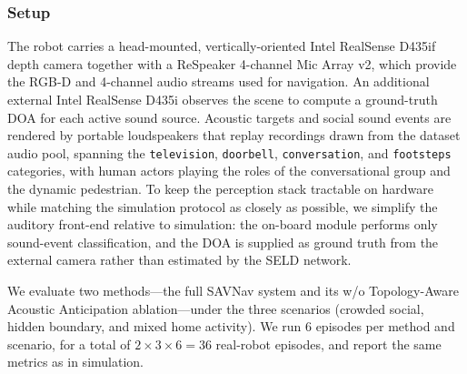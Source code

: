 \subsubsection{Setup}
The robot carries a head-mounted, vertically-oriented Intel RealSense D435if depth camera together with a ReSpeaker 4-channel Mic Array v2, which provide the RGB-D and 4-channel audio streams used for navigation. An additional external Intel RealSense D435i observes the scene to compute a ground-truth DOA for each active sound source. Acoustic targets and social sound events are rendered by portable loudspeakers that replay recordings drawn from the dataset audio pool, spanning the \texttt{television}, \texttt{doorbell}, \texttt{conversation}, and \texttt{footsteps} categories, with human actors playing the roles of the conversational group and the dynamic pedestrian. To keep the perception stack tractable on hardware while matching the simulation protocol as closely as possible, we simplify the auditory front-end relative to simulation: the on-board module performs only sound-event classification, and the DOA is supplied as ground truth from the external camera rather than estimated by the SELD network.

We evaluate two methods---the full SAVNav system and its w/o Topology-Aware Acoustic Anticipation ablation---under the three scenarios (crowded social, hidden boundary, and mixed home activity). We run 6 episodes per method and scenario, for a total of $2\times3\times6=36$ real-robot episodes, and report the same metrics as in simulation.

